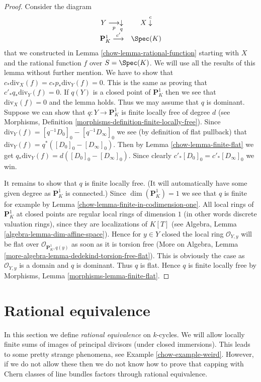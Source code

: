 \begin{proof}

Consider the diagram
$$
\begin{array}{cc}Y \underset{p}{\longrightarrow}\underset{q}{\downarrow} & X \overset{c}{\downarrow} \\ \mathbf{P}^1_K \overset{c'}{\longrightarrow} & \Spec(K)\end{array}
$$
that we constructed in Lemma \ref{chow-lemma-rational-function}
starting with $X$ and the rational function $f$ over $S = \Spec(K)$.
We will use all the results of this lemma without further mention.
We have to show that $c_*\text{div}_X(f) = c_*p_*\text{div}_Y(f) = 0$.
This is the same as proving that $c'_*q_*\text{div}_Y(f) = 0$.
If $q(Y)$ is a closed point of $\mathbf{P}^1_K$ then we
see that $\text{div}_X(f) = 0$ and the lemma holds.
Thus we may assume that $q$ is dominant.
Suppose we can show that $q : Y \to \mathbf{P}^1_K$ is finite
locally free of degree $d$ (see
Morphisms, Definition \ref{morphisms-definition-finite-locally-free}).
Since $\text{div}_Y(f) = [q^{-1}D_0]_0 - [q^{-1}D_\infty]_0$
we see (by definition of flat pullback) that
$\text{div}_Y(f) = q^*([D_0]_0 - [D_\infty]_0)$.
Then by Lemma \ref{chow-lemma-finite-flat} we get
$q_*\text{div}_Y(f) = d([D_0]_0 - [D_\infty]_0)$.
Since clearly $c'_*[D_0]_0 = c'_*[D_\infty]_0$ we win.

\medskip\noindent
It remains to show that $q$ is finite locally free.
(It will automatically have some given degree as $\mathbf{P}^1_K$
is connected.)
Since $\dim(\mathbf{P}^1_K) = 1$ we see that $q$ is finite for example
by Lemma \ref{chow-lemma-finite-in-codimension-one}.
All local rings of $\mathbf{P}^1_K$ at
closed points are regular local rings of dimension $1$
(in other words discrete valuation rings), since they are
localizations of $K[T]$ (see
Algebra, Lemma \ref{algebra-lemma-dim-affine-space}).
Hence for $y\in Y$ closed the local ring $\mathcal{O}_{Y, y}$
will be flat over $\mathcal{O}_{\mathbf{P}^1_K, q(y)}$ as soon as
it is torsion free (More on Algebra, Lemma
\ref{more-algebra-lemma-dedekind-torsion-free-flat}).
This is obviously the case as
$\mathcal{O}_{Y, y}$ is a domain and $q$ is dominant.
Thus $q$ is flat. Hence $q$ is finite locally free by
Morphisms, Lemma \ref{morphisms-lemma-finite-flat}.
\end{proof}

\section{Rational equivalence}
\label{chow-section-rational-equivalence}
In this section we define {\it rational equivalence} on $k$-cycles.
We will allow locally finite sums of images of
principal divisors (under closed immersions). This leads to some
pretty strange phenomena, see Example \ref{chow-example-weird}.
However, if we do not allow these then we do not know how to prove that
capping with Chern classes of line bundles factors through rational
equivalence.

